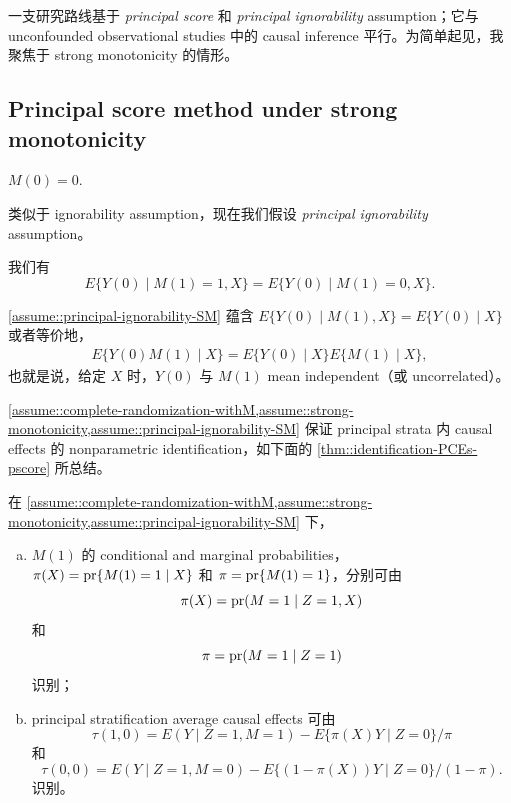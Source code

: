 一支研究路线基于 {\it principal score} 和 {\it principal ignorability} assumption；它与 unconfounded observational studies 中的 causal inference 平行。为简单起见，我聚焦于 strong monotonicity 的情形。



\subsection{Principal score method under strong monotonicity}

\begin{assumption}
\label{assume::strong-monotonicity}
 $M(0) = 0$. 
\end{assumption}


类似于 ignorability assumption，现在我们假设 {\it principal ignorability} assumption。


\begin{assumption}
\label{assume::principal-ignorability-SM}
我们有
$$
E\{  Y(0) \mid M(1) = 1, X \} = E\{  Y(0) \mid M(1) = 0, X \} .
$$ 
\end{assumption}


\cref{assume::principal-ignorability-SM} 蕴含
$
E\{  Y(0) \mid M(1)  , X \} = E\{  Y(0) \mid   X \} 
$
或者等价地，
\begin{eqnarray}
\label{eq::mean-independent}
E\{  Y(0)  M(1)  \mid  X \}  =  E\{  Y(0) \mid   X \}  E\{     M(1)  \mid  X \}  ,
\end{eqnarray}
也就是说，给定 $X$ 时，$Y(0)$ 与 $M(1)$ mean independent（或 uncorrelated）。

\cref{assume::complete-randomization-withM,assume::strong-monotonicity,assume::principal-ignorability-SM} 保证 principal strata 内 causal effects 的 nonparametric identification，如下面的 \cref{thm::identification-PCEs-pscore} 所总结。


\begin{theorem}
\label{thm::identification-PCEs-pscore}
在 \cref{assume::complete-randomization-withM,assume::strong-monotonicity,assume::principal-ignorability-SM} 下，
\begin{enumerate}
[(a)]
\item 
$M(1)$ 的 conditional and marginal probabilities，
$\pi(X) =  \textup{pr}\{ M(1)=1\mid X \}  $ 和 $\pi =  \textup{pr}\{ M(1)=1\} $，分别可由
$$
\pi(X)   =  \textup{pr}(M=1\mid Z=1, X ) 
$$ 
和
$$
\pi  =   \textup{pr}(M=1\mid Z=1 ) 
$$ 
识别；
\item
principal stratification average causal effects 可由
$$
\tau(1,0) = E(Y\mid Z=1, M=1)  - E\{  \pi(X) Y  \mid Z=0 \}/\pi 
$$
和
$$
\tau(0,0) = E(Y\mid Z=1, M=0)  - E\{ (1-\pi(X)) Y  \mid Z=0 \}/(1-\pi) . 
$$
识别。
\end{enumerate}
\end{theorem}


